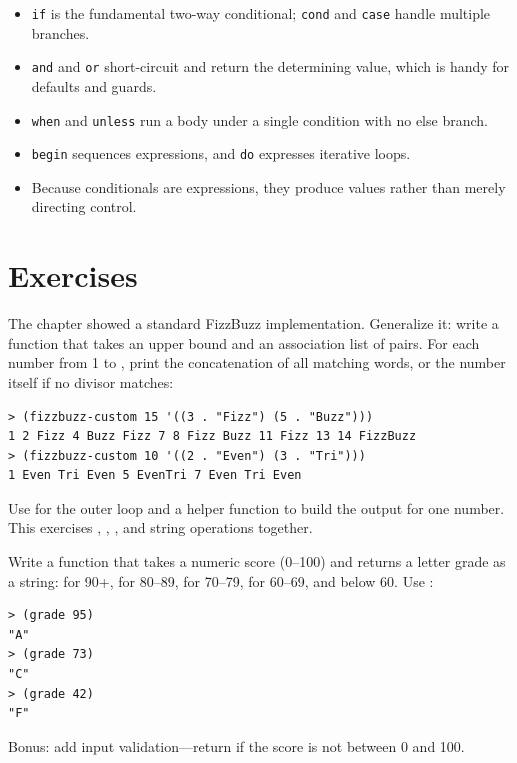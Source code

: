 \begin{itemize}
    \item \texttt{if} is the fundamental two-way conditional; \texttt{cond} and \texttt{case} handle multiple branches.
    \item \texttt{and} and \texttt{or} short-circuit and return the determining value, which is handy for defaults and guards.
    \item \texttt{when} and \texttt{unless} run a body under a single condition with no else branch.
    \item \texttt{begin} sequences expressions, and \texttt{do} expresses iterative loops.
    \item Because conditionals are expressions, they produce values rather than merely directing control.
\end{itemize}

\section*{Exercises}

\begin{exercise}
The chapter showed a standard FizzBuzz implementation. Generalize it: write a function  that takes an upper bound  and an association list of  pairs. For each number from 1 to , print the concatenation of all matching words, or the number itself if no divisor matches:

\begin{lstlisting}[style=repl]
> (fizzbuzz-custom 15 '((3 . "Fizz") (5 . "Buzz")))
1 2 Fizz 4 Buzz Fizz 7 8 Fizz Buzz 11 Fizz 13 14 FizzBuzz
> (fizzbuzz-custom 10 '((2 . "Even") (3 . "Tri")))
1 Even Tri Even 5 EvenTri 7 Even Tri Even
\end{lstlisting}

Use  for the outer loop and a helper function to build the output for one number. This exercises , , , and string operations together.
\end{exercise}

\begin{exercise}
Write a function  that takes a numeric score (0--100) and returns a letter grade as a string:  for 90+,  for 80--89,  for 70--79,  for 60--69, and  below 60. Use :

\begin{lstlisting}[style=repl]
> (grade 95)
"A"
> (grade 73)
"C"
> (grade 42)
"F"
\end{lstlisting}

Bonus: add input validation---return  if the score is not between 0 and 100.
\end{exercise}

